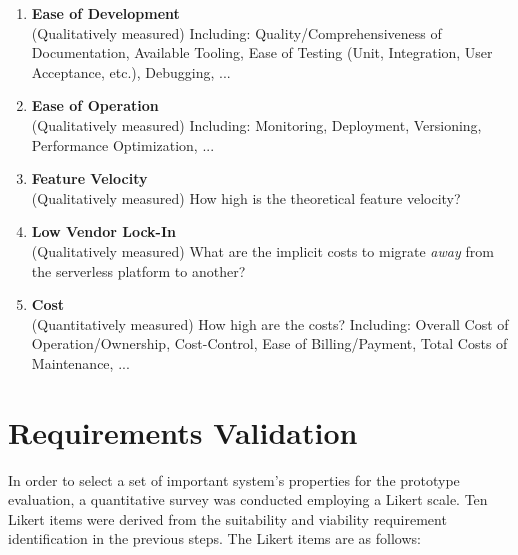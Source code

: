\begin{enumerate}
    \item \textbf{Ease of Development}\\
        (Qualitatively measured) Including: Quality/Comprehensiveness of Documentation, Available Tooling, Ease of Testing (Unit, Integration, User Acceptance, etc.), Debugging, ...
    \item \textbf{Ease of Operation}\\
        (Qualitatively measured) Including: Monitoring, Deployment, Versioning, Performance Optimization, ...
    \item \textbf{Feature Velocity}\\
        (Qualitatively measured) How high is the theoretical feature velocity?
    \item \textbf{Low Vendor Lock-In}\\
        (Qualitatively measured) What are the implicit costs to migrate \textit{away} from the serverless platform to another?
    \item \textbf{Cost}\\
        (Quantitatively measured) How high are the costs? Including: Overall Cost of Operation/Ownership, Cost-Control, Ease of Billing/Payment, Total Costs of Maintenance, ...
\end{enumerate}


\section{Requirements Validation}\label{sec:reqVal}

In order to select a set of important system's properties for the prototype evaluation, a quantitative survey was conducted employing a Likert scale. Ten Likert items were derived from the suitability and viability requirement identification in the previous steps. The Likert items are as follows:

